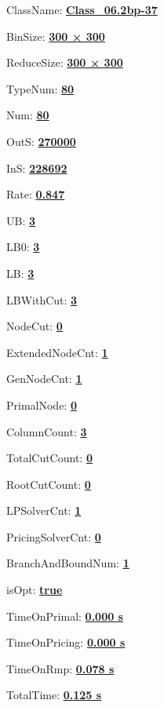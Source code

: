 \documentclass[11pt]{article}
\begin{document}
\pagestyle{empty}


ClassName: \underline{\textbf{Class_06.2bp-37}}
\par
BinSize: \underline{\textbf{300 × 300}}
\par
ReduceSize: \underline{\textbf{300 × 300}}
\par
TypeNum: \underline{\textbf{80}}
\par
Num: \underline{\textbf{80}}
\par
OutS: \underline{\textbf{270000}}
\par
InS: \underline{\textbf{228692}}
\par
Rate: \underline{\textbf{0.847}}
\par
UB: \underline{\textbf{3}}
\par
LB0: \underline{\textbf{3}}
\par
LB: \underline{\textbf{3}}
\par
LBWithCut: \underline{\textbf{3}}
\par
NodeCut: \underline{\textbf{0}}
\par
ExtendedNodeCnt: \underline{\textbf{1}}
\par
GenNodeCnt: \underline{\textbf{1}}
\par
PrimalNode: \underline{\textbf{0}}
\par
ColumnCount: \underline{\textbf{3}}
\par
TotalCutCount: \underline{\textbf{0}}
\par
RootCutCount: \underline{\textbf{0}}
\par
LPSolverCnt: \underline{\textbf{1}}
\par
PricingSolverCnt: \underline{\textbf{0}}
\par
BranchAndBoundNum: \underline{\textbf{1}}
\par
isOpt: \underline{\textbf{true}}
\par
TimeOnPrimal: \underline{\textbf{0.000 s}}
\par
TimeOnPricing: \underline{\textbf{0.000 s}}
\par
TimeOnRmp: \underline{\textbf{0.078 s}}
\par
TotalTime: \underline{\textbf{0.125 s}}
\par
\newpage
\end{document}
